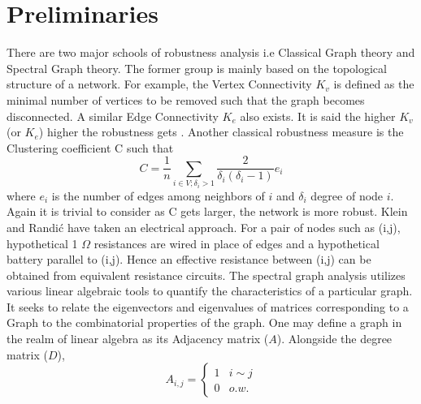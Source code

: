 \documentclass{article}
\begin{document}
	\section{Preliminaries}
	There are two major schools of robustness analysis i.e Classical Graph theory and Spectral Graph theory. The former group is mainly based on the topological structure of a network. For example, the Vertex Connectivity $K_v$ is defined as the minimal number of vertices to be removed such that the graph becomes disconnected. A similar Edge Connectivity $K_e$ also exists. It is said the higher $K_v$ (or $K_e$) higher the robustness gets \cite{ellens2013graph}. Another classical robustness measure is the Clustering coefficient \cite{watts1998collective} C such that
	\begin{equation*}
		C = \frac{1}{n} \sum_{i\in V;\delta_i>1}\frac{2}{\delta_i(\delta_i -1)}e_i
	\end{equation*}
	where $e_i$ is the number of edges among neighbors of $i$ and $\delta_i$ degree of node $i$. Again it is trivial to consider as C gets larger, the network is more robust.
	Klein and Randi\'{c} \cite{klein1993m} have taken an electrical approach. For a pair of nodes such as (i,j), hypothetical 1 $\Omega$ resistances are wired in place of edges and a hypothetical battery parallel to (i,j). Hence an effective resistance between (i,j) can be obtained from equivalent resistance circuits.
	The spectral graph analysis utilizes various linear algebraic tools to quantify the characteristics of a particular graph. It seeks to relate the eigenvectors and eigenvalues of matrices corresponding to a Graph to the combinatorial properties of the graph. One may define a graph in the realm of linear algebra as its Adjacency matrix ($A$). Alongside the degree matrix ($D$),
	\begin{equation*}
		A_{i,j} = \begin{cases}
			1	& i\sim j \\
			0	& o.w. 
		\end{cases}
	\end{equation*}
	
\end{document}
